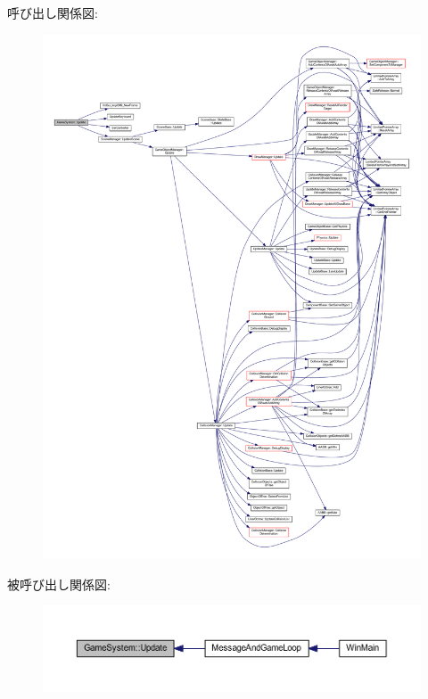 呼び出し関係図\+:
\nopagebreak
\begin{figure}[H]
\begin{center}
\leavevmode
\includegraphics[width=350pt]{class_game_system_ab0add1f2bd97d3b125a5682f571053a3_cgraph}
\end{center}
\end{figure}
被呼び出し関係図\+:
\nopagebreak
\begin{figure}[H]
\begin{center}
\leavevmode
\includegraphics[width=350pt]{class_game_system_ab0add1f2bd97d3b125a5682f571053a3_icgraph}
\end{center}
\end{figure}


